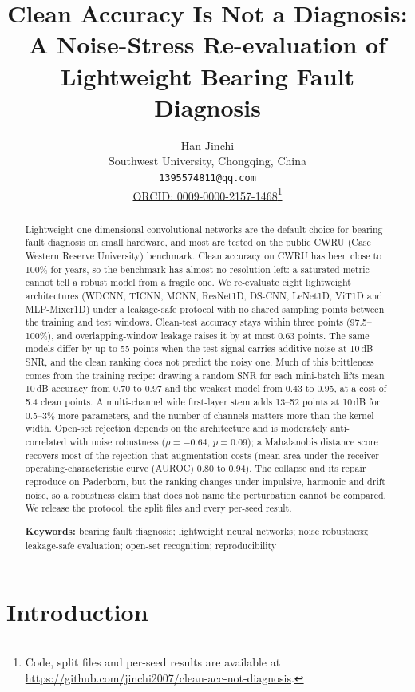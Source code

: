 \documentclass[11pt,a4paper]{article}
\title{\bfseries Clean Accuracy Is Not a Diagnosis:\\
A Noise-Stress Re-evaluation of Lightweight Bearing Fault Diagnosis}
\author{Han Jinchi\\ Southwest University, Chongqing, China\\ \texttt{1395574811@qq.com}\\ \href{https://orcid.org/0009-0000-2157-1468}{ORCID: 0009-0000-2157-1468}\thanks{Code, split files and per-seed results are available at \url{https://github.com/jinchi2007/clean-acc-not-diagnosis}.}}
\date{}
\begin{document}
\maketitle

\begin{abstract}
\noindent
Lightweight one-dimensional convolutional networks are the default choice for bearing fault diagnosis on small hardware, and most are tested on the public CWRU (Case Western Reserve University) benchmark. Clean accuracy on CWRU has been close to 100\% for years, so the benchmark has almost no resolution left: a saturated metric cannot tell a robust model from a fragile one. We re-evaluate eight lightweight architectures (WDCNN, TICNN, MCNN, ResNet1D, DS-CNN, LeNet1D, ViT1D and MLP-Mixer1D) under a leakage-safe protocol with no shared sampling points between the training and test windows. Clean-test accuracy stays within three points (97.5--100\%), and overlapping-window leakage raises it by at most 0.63 points. The same models differ by up to 55 points when the test signal carries additive noise at 10\,dB SNR, and the clean ranking does not predict the noisy one. Much of this brittleness comes from the training recipe: drawing a random SNR for each mini-batch lifts mean 10\,dB accuracy from 0.70 to 0.97 and the weakest model from 0.43 to 0.95, at a cost of 5.4 clean points. A multi-channel wide first-layer stem adds 13--52 points at 10\,dB for 0.5--3\% more parameters, and the number of channels matters more than the kernel width. Open-set rejection depends on the architecture and is moderately anti-correlated with noise robustness ($\rho=-0.64$, $p=0.09$); a Mahalanobis distance score recovers most of the rejection that augmentation costs (mean area under the receiver-operating-characteristic curve (AUROC) 0.80 to 0.94). The collapse and its repair reproduce on Paderborn, but the ranking changes under impulsive, harmonic and drift noise, so a robustness claim that does not name the perturbation cannot be compared. We release the protocol, the split files and every per-seed result.

\vspace{0.5em}
\noindent\textbf{Keywords:} bearing fault diagnosis; lightweight neural networks; noise robustness; leakage-safe evaluation; open-set recognition; reproducibility
\end{abstract}

\section{Introduction}
\end{document}

